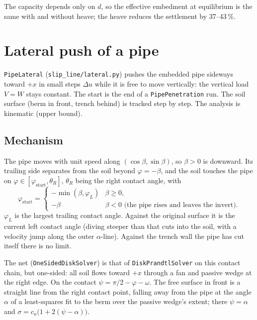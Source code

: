\documentclass[11pt,a4paper]{article}
\begin{document}
The capacity depends only on $d$, so the effective embedment at
equilibrium is the same with and without heave; the heave reduces the
settlement by 37--43\,\%.

\section{Lateral push of a pipe}
\label{sec:lateral}

\texttt{PipeLateral} (\texttt{slip\_line/lateral.py}) pushes the
embedded pipe sideways toward $+x$ in small steps $\Delta u$ while it
is free to move vertically: the vertical load $V = W$ stays constant.
The start is the end of a \texttt{PipePenetration} run.  The soil
surface (berm in front, trench behind) is tracked step by step.  The
analysis is kinematic (upper bound).

\subsection{Mechanism}

The pipe moves with unit speed along $(\cos\beta, \sin\beta)$, so
$\beta > 0$ is downward.  Its trailing side separates from the soil
beyond $\varphi = -\beta$, and the soil touches the pipe on
$\varphi \in [\varphi_\text{start}, \theta_R]$, $\theta_R$ being the
right contact angle, with
\begin{equation}
  \varphi_\text{start} =
  \begin{cases}
    -\min(\beta, \varphi_L) & \beta \ge 0, \\
    -\beta & \beta < 0 \text{ (the pipe rises and leaves the invert).}
  \end{cases}
\end{equation}
$\varphi_L$ is the largest trailing contact angle.  Against the
original surface it is the current left contact angle (diving steeper
than that cuts into the soil, with a velocity jump along the outer
$\alpha$-line).  Against the trench wall the pipe has cut itself there
is no limit.

The net (\texttt{OneSidedDiskSolver}) is that of
\texttt{DiskPrandtlSolver} on this contact chain, but one-sided: all
soil flows toward $+x$ through a fan and passive wedge at the right
edge.  On the contact $\psi = \pi/2 - \varphi - \omega$.  The free
surface in front is a straight line from the right contact point,
falling away from the pipe at the angle $\alpha$ of a least-squares fit
to the berm over the passive wedge's extent; there $\psi = \alpha$ and
$\sigma = c_u\bigl(1 + 2(\psi - \alpha)\bigr)$.
\end{document}

